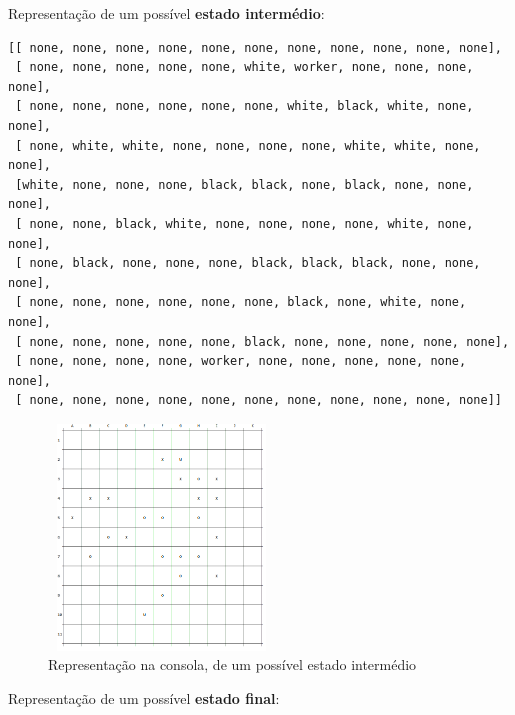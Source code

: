 \documentclass[a4paper]{article}
\begin{document}
\clearpage

Representação de um possível \textbf{estado intermédio}:\newline

\begin{small}
\begin{lstlisting}
[[ none, none, none, none, none, none, none, none, none, none, none],
 [ none, none, none, none, none, white, worker, none, none, none, none],
 [ none, none, none, none, none, none, white, black, white, none, none],
 [ none, white, white, none, none, none, none, white, white, none, none],
 [white, none, none, none, black, black, none, black, none, none, none],
 [ none, none, black, white, none, none, none, none, white, none, none],
 [ none, black, none, none, none, black, black, black, none, none, none],
 [ none, none, none, none, none, none, black, none, white, none, none],
 [ none, none, none, none, none, black, none, none, none, none, none],
 [ none, none, none, none, worker, none, none, none, none, none, none],
 [ none, none, none, none, none, none, none, none, none, none, none]]
\end{lstlisting}
\end{small}

\begin{figure}[h!]
\begin{center}
	\includegraphics[height=6cm, width=6cm]{images/self_semi_board.png}
	\caption{Representação na consola, de um possível estado intermédio}
	\label{Figura 6}
\end{center}
\end{figure}

\clearpage
Representação de um possível \textbf{estado final}:\newline
\end{document}
